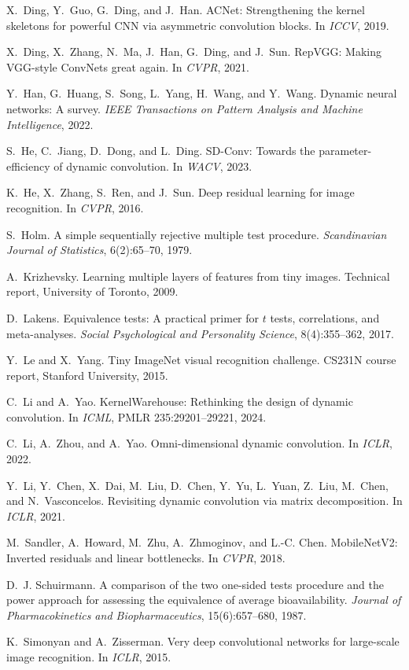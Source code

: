 \documentclass{article}
\begin{document}
X.~Ding, Y.~Guo, G.~Ding, and J.~Han. ACNet: Strengthening the kernel skeletons for powerful CNN via asymmetric convolution blocks. In \emph{ICCV}, 2019.

X.~Ding, X.~Zhang, N.~Ma, J.~Han, G.~Ding, and J.~Sun. RepVGG: Making VGG-style ConvNets great again. In \emph{CVPR}, 2021.

Y.~Han, G.~Huang, S.~Song, L.~Yang, H.~Wang, and Y.~Wang. Dynamic neural networks: A survey. \emph{IEEE Transactions on Pattern Analysis and Machine Intelligence}, 2022.

S.~He, C.~Jiang, D.~Dong, and L.~Ding. SD-Conv: Towards the parameter-efficiency of dynamic convolution. In \emph{WACV}, 2023.

K.~He, X.~Zhang, S.~Ren, and J.~Sun. Deep residual learning for image recognition. In \emph{CVPR}, 2016.

S.~Holm. A simple sequentially rejective multiple test procedure. \emph{Scandinavian Journal of Statistics}, 6(2):65--70, 1979.

A.~Krizhevsky. Learning multiple layers of features from tiny images. Technical report, University of Toronto, 2009.

D.~Lakens. Equivalence tests: A practical primer for $t$ tests, correlations, and meta-analyses. \emph{Social Psychological and Personality Science}, 8(4):355--362, 2017.

Y.~Le and X.~Yang. Tiny ImageNet visual recognition challenge. CS231N course report, Stanford University, 2015.

C.~Li and A.~Yao. KernelWarehouse: Rethinking the design of dynamic convolution. In \emph{ICML}, PMLR 235:29201--29221, 2024.

C.~Li, A.~Zhou, and A.~Yao. Omni-dimensional dynamic convolution. In \emph{ICLR}, 2022.

Y.~Li, Y.~Chen, X.~Dai, M.~Liu, D.~Chen, Y.~Yu, L.~Yuan, Z.~Liu, M.~Chen, and N.~Vasconcelos. Revisiting dynamic convolution via matrix decomposition. In \emph{ICLR}, 2021.

M.~Sandler, A.~Howard, M.~Zhu, A.~Zhmoginov, and L.-C. Chen. MobileNetV2: Inverted residuals and linear bottlenecks. In \emph{CVPR}, 2018.

D.~J. Schuirmann. A comparison of the two one-sided tests procedure and the power approach for assessing the equivalence of average bioavailability. \emph{Journal of Pharmacokinetics and Biopharmaceutics}, 15(6):657--680, 1987.

K.~Simonyan and A.~Zisserman. Very deep convolutional networks for large-scale image recognition. In \emph{ICLR}, 2015.
\end{document}
